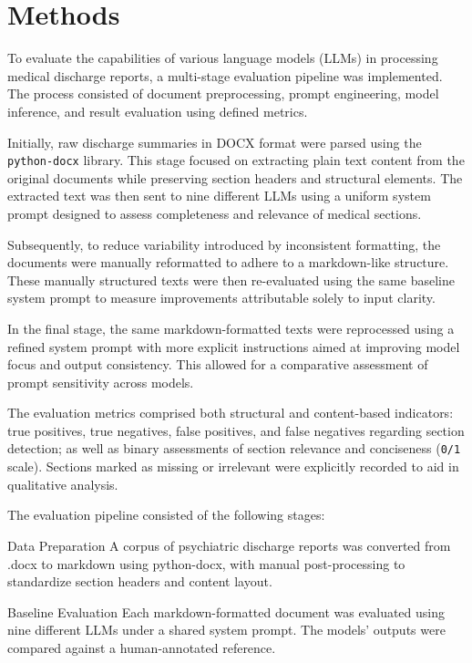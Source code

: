 \section{Methods}

To evaluate the capabilities of various language models (LLMs) in 
processing medical discharge reports, a multi-stage evaluation pipeline 
was implemented. The process consisted of document preprocessing, 
prompt engineering, model inference, and result evaluation using defined metrics.

Initially, raw discharge summaries in DOCX format were parsed 
using the \texttt{python-docx} library. This stage focused on extracting 
plain text content from the original documents while preserving section 
headers and structural elements. The extracted text was then sent to nine 
different LLMs using a uniform system prompt designed to assess completeness and 
relevance of medical sections.

Subsequently, to reduce variability introduced by inconsistent formatting, 
the documents were manually reformatted to adhere to a markdown-like structure. 
These manually structured texts were then re-evaluated using the same baseline 
system prompt to measure improvements attributable solely to input clarity.

In the final stage, the same markdown-formatted texts were reprocessed using 
a refined system prompt with more explicit instructions aimed at improving model 
focus and output consistency. This allowed for a comparative assessment of 
prompt sensitivity across models.

The evaluation metrics comprised both structural and content-based indicators: 
true positives, true negatives, false positives, and false negatives regarding 
section detection; as well as binary assessments of section relevance and conciseness 
(\texttt{0/1} scale). Sections marked as missing or irrelevant were explicitly 
recorded to aid in qualitative analysis.

The evaluation pipeline consisted of the following stages:

    Data Preparation
    A corpus of psychiatric discharge reports was converted from .docx to markdown using python-docx, with manual post-processing to standardize section headers and content layout.

    Baseline Evaluation
    Each markdown-formatted document was evaluated using nine different LLMs under a shared system prompt. The models' outputs were compared against a human-annotated reference.

